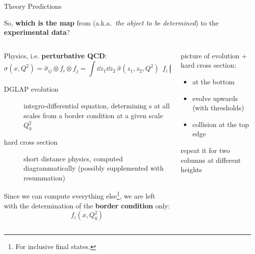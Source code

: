 \documentclass[9pt]{beamer}
\begin{document}
\begin{frame}{Theory Predictions}
    \begin{center}
        So, \alert{\textbf{which is the map}} from \textbf{\pdf} (a.k.a.\
        \textit{the object to be determined}) to the \textbf{experimental
        data}?
    \end{center}
    \vspace*{20pt}

    \begin{columns}
        \begin{column}{0.5\textwidth}
            Physics, i.e. \alert{\textbf{perturbative QCD}}:
            \begin{equation*}
                \sigma(x, Q^2) = \hat{\sigma}_{ij} \otimes f_i \otimes f_j =
                \int \dd z_1 \dd z_2 ~\hat{\sigma}(z_1, z_2, Q^2)~~
                f_i\left(\frac{x}{z_1}, Q^2\right) f_i\left(\frac{x}{z_2},
                Q^2\right)
            \end{equation*}

            \begin{description}
                \item[DGLAP evolution] integro-differential equation,
                    determining \pdf{}s at all scales from a border condition
                    at a given scale $Q_0^2$
                \item[hard cross section] short distance physics, computed
                    diagrammatically (possibly supplemented with resummation)
            \end{description}

            \vspace*{20pt}
            Since we can compute everything else\footnote{For inclusive final
            states.}, we are left with the determination of the
            \alert{\textbf{border condition}} only:
            \begin{equation*}
                f_i(x, Q_0^2)
            \end{equation*}
            \vspace*{5pt}
        \end{column}
        \begin{column}{0.5\textwidth}
            picture of evolution + hard cross section:
            \begin{itemize}
                \item \pdf at the bottom
                \item evolve upwards (with thresholds)
                \item collision at the top edge
            \end{itemize}
            repeat it for two columns at different heights
        \end{column}
    \end{columns}
\end{frame}
\end{document}
